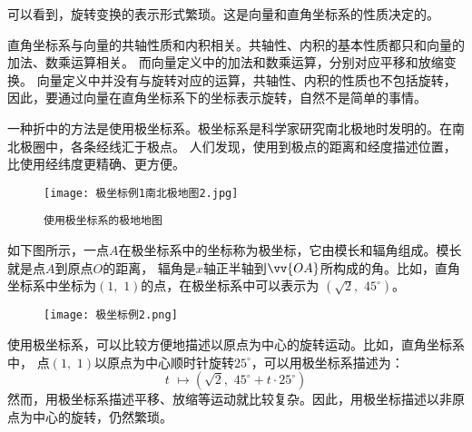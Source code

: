 \documentclass[12pt,UTF8]{ctexbook}
\begin{document}
可以看到，旋转变换的表示形式繁琐。这是向量和直角坐标系的性质决定的。

直角坐标系与向量的共轴性质和内积相关。共轴性、内积的基本性质都只和向量的加法、数乘运算相关。
而向量定义中的加法和数乘运算，分别对应平移和放缩变换。
向量定义中并没有与旋转对应的运算，共轴性、内积的性质也不包括旋转，
因此，要通过向量在直角坐标系下的坐标表示旋转，自然不是简单的事情。

一种折中的方法是使用极坐标系。极坐标系是科学家研究南北极地时发明的。在南北极圈中，各条经线汇于极点。
人们发现，使用到极点的距离和经度描述位置，比使用经纬度更精确、更方便。

\begin{figure}[h] %
    \centering
    \texttt{[image: 极坐标例1南北极地图2.jpg]}
    \caption*{\texttt{使用极坐标系的极地地图}}
\end{figure}
如下图所示，一点$A$在极坐标系中的坐标称为极坐标，它由模长和辐角组成。模长就是点$A$到原点$O$的距离，
辐角是$x$轴正半轴到$\vv{OA}$所构成的角。比如，直角坐标系中坐标为$(1,\,\,1)$的点，在极坐标系中可以表示为
$(\sqrt{2},\,\, 45^\circ)$。

\begin{figure}[h] %
    \vspace{4pt}
    \centering
    \texttt{[image: 极坐标例2.png]}
\end{figure}

使用极坐标系，可以比较方便地描述以原点为中心的旋转运动。比如，直角坐标系中，
点$(1,\,\,1)$以原点为中心顺时针旋转$25^\circ$，可以用极坐标系描述为：
$$ t\,\, \mapsto (\sqrt{2}, \,\, 45^\circ + t \cdot 25^\circ)$$
然而，用极坐标系描述平移、放缩等运动就比较复杂。因此，用极坐标描述以非原点为中心的旋转，仍然繁琐。
\end{document}
